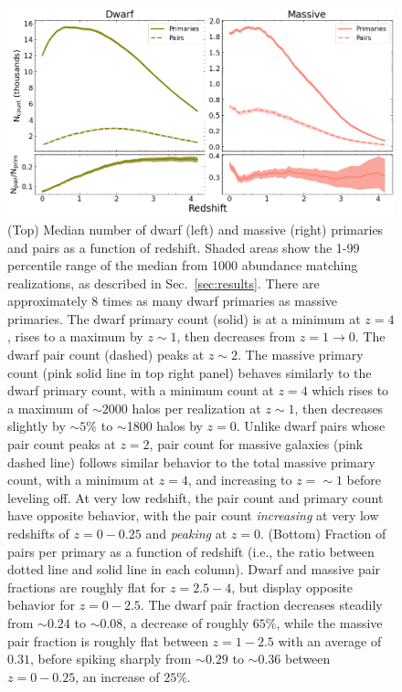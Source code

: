 \documentclass[twocolumn]{aastex631}
\begin{document}
\begin{figure}[htb]
    \centering
    \includegraphics[width=\textwidth]{counts_1000.png}
    \caption{(Top) Median number of dwarf (left) and massive (right) primaries and pairs as a function of redshift.
    Shaded areas show the 1-99 percentile range of the median from 1000 abundance matching realizations, as described in Sec.~\ref{sec:results}.
    There are approximately 8 times as many dwarf primaries as massive primaries. 
    The dwarf primary count (solid) is at a minimum at $z=4$, rises to a maximum by $z\sim1$, then decreases from $z=1\to0$. 
    The dwarf pair count (dashed) peaks at $z\sim2$.
    The massive primary count (pink solid line in top right panel) behaves similarly to the dwarf primary count, with a minimum count at $z=4$ which rises to a maximum of $\sim2000$ halos per realization at $z\sim1$, then decreases slightly by $\sim5\%$ to $\sim$1800 halos by $z=0$. 
    Unlike dwarf pairs whose pair count peaks at $z=2$, pair count for massive galaxies (pink dashed line) follows similar behavior to the total massive primary count, with a minimum at $z=4$, and increasing to $z=\sim 1$ before leveling off. At very low redshift, the pair count and primary count have opposite behavior, with the pair count \textit{increasing} at very low redshifts of $z=0-0.25$ and \textit{peaking} at $z=0$.
    (Bottom) Fraction of pairs per primary as a function of redshift (i.e., the ratio between dotted line and solid line in each column). Dwarf and massive pair fractions are roughly flat for $z=2.5-4$, but display opposite behavior for $z=0-2.5$. The dwarf pair fraction decreases steadily from $\sim0.24$ to $\sim0.08$, a decrease of roughly $65\%$, while the massive pair fraction is roughly flat between $z=1-2.5$ with an average of $0.31$, before spiking sharply from $\sim 0.29$ to $\sim 0.36$ between $z=0-0.25$, an increase of $25\%$.}
    \label{fig:counts}
\end{figure}
\end{document}
